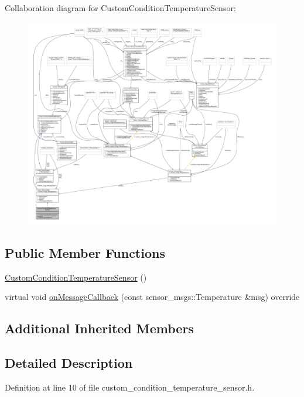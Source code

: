Collaboration diagram for Custom\+Condition\+Temperature\+Sensor\+:
\nopagebreak
\begin{figure}[H]
\begin{center}
\leavevmode
\includegraphics[width=350pt]{classCustomConditionTemperatureSensor__coll__graph}
\end{center}
\end{figure}
\subsection*{Public Member Functions}
\begin{DoxyCompactItemize}
\item 
\hyperlink{classCustomConditionTemperatureSensor_a61cf97136c5d24334ce1c5a25f981ccc}{Custom\+Condition\+Temperature\+Sensor} ()
\item 
virtual void \hyperlink{classCustomConditionTemperatureSensor_a34847ebb7d87c53d332e1b8c956e9720}{on\+Message\+Callback} (const sensor\+\_\+msgs\+::\+Temperature \&msg) override
\end{DoxyCompactItemize}
\subsection*{Additional Inherited Members}


\subsection{Detailed Description}


Definition at line 10 of file custom\+\_\+condition\+\_\+temperature\+\_\+sensor.\+h.



